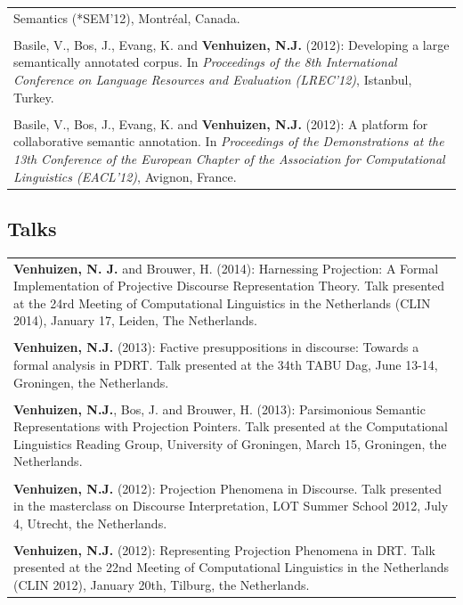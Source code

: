 \documentclass[a4paper,10pt]{article}
\begin{document}
\begin{tabularx}{\textwidth}{ X }
{    Semantics (*SEM'12)}, Montr\'eal, Canada.\\
    \\
    Basile, V., Bos, J., Evang, K. and \textbf{Venhuizen, N.J.} (2012): Developing
    a large semantically annotated corpus. In \textit{Proceedings of the 8th
    International Conference on Language Resources and Evaluation (LREC'12)},
    Istanbul, Turkey.\\
    \\
    Basile, V., Bos, J., Evang, K. and \textbf{Venhuizen, N.J.} (2012): A platform
    for collaborative semantic annotation. In \textit{Proceedings of the
    Demonstrations at the 13th Conference of the European Chapter of the
    Association for Computational Linguistics (EACL'12)}, Avignon, France.\\
\end{tabularx}

\subsection*{Talks}

\noindent
\begin{tabularx}{\textwidth}{ X }
    \textbf{Venhuizen, N. J.} and Brouwer, H. (2014): Harnessing Projection: A Formal
    Implementation of Projective Discourse Representation Theory. Talk
    presented at the 24rd Meeting of Computational Linguistics in the
    Netherlands (CLIN 2014), January 17, Leiden, The Netherlands.\\
    \\
    \textbf{Venhuizen, N.J.} (2013): Factive presuppositions in discourse:
    Towards a formal analysis in PDRT. Talk presented at the 34th TABU Dag,
    June 13-14, Groningen, the Netherlands.\\
    \\
    \textbf{Venhuizen, N.J.}, Bos, J. and Brouwer, H. (2013): Parsimonious 
    Semantic Representations with Projection Pointers. Talk presented at the
    Computational Linguistics Reading Group, University of Groningen, March 15,
    Groningen, the Netherlands.\\
    \\
    \textbf{Venhuizen, N.J.} (2012): Projection Phenomena in Discourse. Talk
    presented in the masterclass on Discourse Interpretation, LOT Summer
    School 2012, July 4, Utrecht, the Netherlands.\\
    \\
    \textbf{Venhuizen, N.J.} (2012): Representing Projection Phenomena in DRT. Talk
    presented at the 22nd Meeting of Computational Linguistics in the
    Netherlands (CLIN 2012), January 20th, Tilburg, the Netherlands.\\
\end{tabularx}
\end{document}
